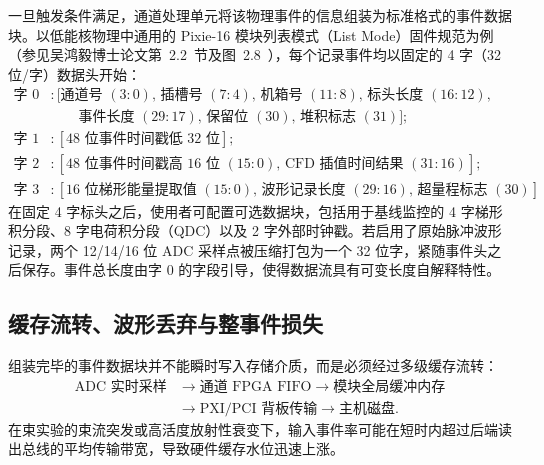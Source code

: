 一旦触发条件满足，通道处理单元将该物理事件的信息组装为标准格式的事件数据块。以低能核物理中通用的 Pixie-16 模块列表模式（List Mode）固件规范为例（参见吴鸿毅博士论文第~2.2~节及图~2.8~\cite[印刷第~42--43~页]{wu-hongyi-2020-general-purpose-digital-daq-thesis}），每个记录事件均以固定的 4 字（32 位/字）数据头开始：
\begin{align}
\text{字 } 0 &: [\text{通道号 } (3:0), \, \text{插槽号 } (7:4), \, \text{机箱号 } (11:8), \, \text{标头长度 } (16:12), \nonumber \\
&\quad\quad \text{事件长度 } (29:17), \, \text{保留位 } (30), \, \text{堆积标志 } (31)]; \label{eq:5-5-word0} \\
\text{字 } 1 &: [48\text{ 位事件时间戳低 } 32\text{ 位}]; \label{eq:5-5-word1} \\
\text{字 } 2 &: [48\text{ 位事件时间戳高 } 16\text{ 位 } (15:0), \, \text{CFD 插值时间结果 } (31:16)]; \label{eq:5-5-word2} \\
\text{字 } 3 &: [16\text{ 位梯形能量提取值 } (15:0), \, \text{波形记录长度 } (29:16), \, \text{超量程标志 } (30)]. \label{eq:5-5-word3}
\end{align}
在固定 4 字标头之后，使用者可配置可选数据块，包括用于基线监控的 4 字梯形积分段、8 字电荷积分段（QDC）以及 2 字外部时钟戳。若启用了原始脉冲波形记录，两个 12/14/16 位 ADC 采样点被压缩打包为一个 32 位字，紧随事件头之后保存。事件总长度由字 0 的字段引导，使得数据流具有可变长度自解释特性。

\subsection{缓存流转、波形丢弃与整事件损失}\label{subsec:5-5-2}

组装完毕的事件数据块并不能瞬时写入存储介质，而是必须经过多级缓存流转：
\begin{align*}
\text{ADC 实时采样} &\longrightarrow \text{通道 FPGA FIFO} \longrightarrow \text{模块全局缓冲内存} \\
&\longrightarrow \text{PXI/PCI 背板传输} \longrightarrow \text{主机磁盘}.
\end{align*}
在束实验的束流突发或高活度放射性衰变下，输入事件率可能在短时内超过后端读出总线的平均传输带宽，导致硬件缓存水位迅速上涨。


